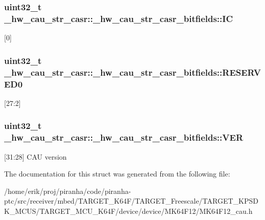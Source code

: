 \subsubsection[{\texorpdfstring{IC}{IC}}]{\setlength{\rightskip}{0pt plus 5cm}uint32\+\_\+t \+\_\+hw\+\_\+cau\+\_\+str\+\_\+casr\+::\+\_\+hw\+\_\+cau\+\_\+str\+\_\+casr\+\_\+bitfields\+::\+IC}\hypertarget{struct__hw__cau__str__casr_1_1__hw__cau__str__casr__bitfields_a39ebaf34d3dba4a78b0df2eaa88ce610}{}\label{struct__hw__cau__str__casr_1_1__hw__cau__str__casr__bitfields_a39ebaf34d3dba4a78b0df2eaa88ce610}
\mbox{[}0\mbox{]} 
\subsubsection[{\texorpdfstring{R\+E\+S\+E\+R\+V\+E\+D0}{RESERVED0}}]{\setlength{\rightskip}{0pt plus 5cm}uint32\+\_\+t \+\_\+hw\+\_\+cau\+\_\+str\+\_\+casr\+::\+\_\+hw\+\_\+cau\+\_\+str\+\_\+casr\+\_\+bitfields\+::\+R\+E\+S\+E\+R\+V\+E\+D0}\hypertarget{struct__hw__cau__str__casr_1_1__hw__cau__str__casr__bitfields_a04be78412a81b4010824707cf7fe4bb1}{}\label{struct__hw__cau__str__casr_1_1__hw__cau__str__casr__bitfields_a04be78412a81b4010824707cf7fe4bb1}
\mbox{[}27\+:2\mbox{]} 
\subsubsection[{\texorpdfstring{V\+ER}{VER}}]{\setlength{\rightskip}{0pt plus 5cm}uint32\+\_\+t \+\_\+hw\+\_\+cau\+\_\+str\+\_\+casr\+::\+\_\+hw\+\_\+cau\+\_\+str\+\_\+casr\+\_\+bitfields\+::\+V\+ER}\hypertarget{struct__hw__cau__str__casr_1_1__hw__cau__str__casr__bitfields_a11af20eac76f8d950e0471f134908d1a}{}\label{struct__hw__cau__str__casr_1_1__hw__cau__str__casr__bitfields_a11af20eac76f8d950e0471f134908d1a}
\mbox{[}31\+:28\mbox{]} C\+AU version 

The documentation for this struct was generated from the following file\+:\begin{DoxyCompactItemize}
\item 
/home/erik/proj/piranha/code/piranha-\/ptc/src/receiver/mbed/\+T\+A\+R\+G\+E\+T\+\_\+\+K64\+F/\+T\+A\+R\+G\+E\+T\+\_\+\+Freescale/\+T\+A\+R\+G\+E\+T\+\_\+\+K\+P\+S\+D\+K\+\_\+\+M\+C\+U\+S/\+T\+A\+R\+G\+E\+T\+\_\+\+M\+C\+U\+\_\+\+K64\+F/device/device/\+M\+K64\+F12/M\+K64\+F12\+\_\+cau.\+h\end{DoxyCompactItemize}
